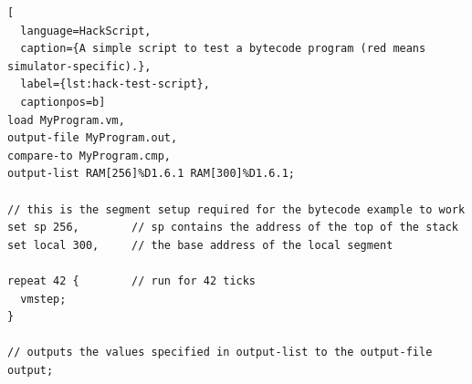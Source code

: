 \begin{lstlisting}[
  language=HackScript,
  caption={A simple script to test a bytecode program (red means simulator-specific).},
  label={lst:hack-test-script},
  captionpos=b]
load MyProgram.vm,
output-file MyProgram.out,
compare-to MyProgram.cmp,
output-list RAM[256]%D1.6.1 RAM[300]%D1.6.1;

// this is the segment setup required for the bytecode example to work
set sp 256,        // sp contains the address of the top of the stack
set local 300,     // the base address of the local segment

repeat 42 {        // run for 42 ticks
  vmstep;
}

// outputs the values specified in output-list to the output-file
output;
\end{lstlisting}
